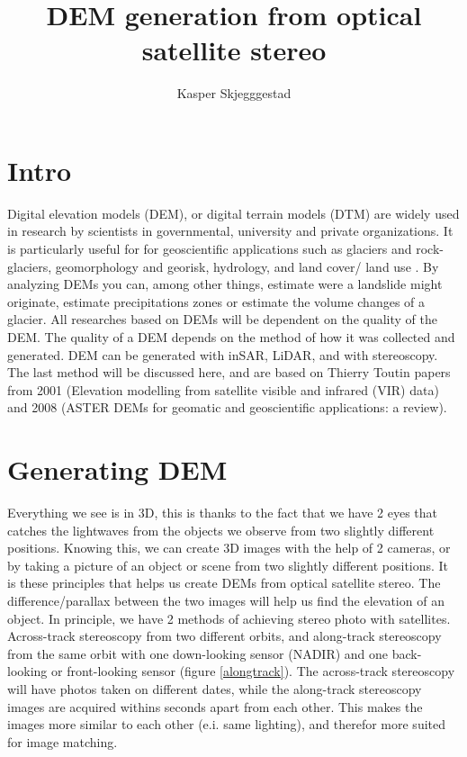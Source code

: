 \documentclass[a4paper,UKenglish]{article}
\title{DEM generation from optical satellite stereo}
\author{Kasper Skjegggestad}
\begin{document}
\maketitle
\tableofcontents

\section{Intro}

Digital elevation models (DEM), or digital terrain models (DTM) are widely used in research by scientists in governmental, university and private organizations. It is particularly useful for for geoscientific applications such as glaciers and rock-glaciers, geomorphology and georisk, hydrology, and land cover/ land use \citep{toutin08}. By analyzing DEMs you can, among other things, estimate were a landslide might originate, estimate precipitations zones or estimate the volume changes of a glacier. All researches based on DEMs will be dependent on the quality of the DEM. The quality of a DEM depends on the method of how it was collected and generated. DEM can be generated with inSAR, LiDAR, and with stereoscopy. The last method will be discussed here, and are based on Thierry Toutin papers from 2001 (Elevation modelling from satellite visible and infrared (VIR) data) and 2008 (ASTER DEMs for geomatic and geoscientific applications: a review).

\section{Generating DEM}
Everything we see is in 3D, this is thanks to the fact that we have 2 eyes that catches the lightwaves from the objects we observe from two slightly different positions. Knowing this, we can create 3D images with the help of 2 cameras, or by taking a picture of an object or scene from two slightly different positions. It is these principles that helps us create DEMs from optical satellite stereo. The difference/parallax between the two images will help us find the elevation of an object. In principle, we have 2 methods of achieving stereo photo with satellites. Across-track stereoscopy from two different orbits, and along-track stereoscopy from the same orbit with one down-looking sensor (NADIR) and one back-looking or front-looking sensor (figure \ref{alongtrack}). The across-track stereoscopy will have photos taken on different dates, while the along-track stereoscopy images are acquired withins seconds apart from each other. This makes the images more similar to each other (e.i. same lighting), and therefor more suited for image matching.
\end{document}

